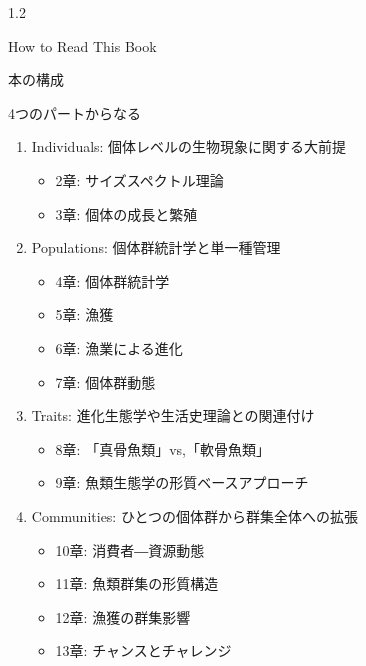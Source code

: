 \documentclass[
  ignorenonframetext,
]{beamer}
\providecommand{\tightlist}{%
  \setlength{\itemsep}{0pt}\setlength{\parskip}{0pt}}
\begin{document}
\begin{frame}

\begin{LARGE} 
\begin{center}
\begin{bf}
1.2   
  
How to Read This Book
\end{bf}
\end{center}
\end{LARGE}

\end{frame}

\begin{frame}{本の構成}
\protect\hypertarget{ux672cux306eux69cbux6210}{}

\begin{block}{4つのパートからなる}

\begin{enumerate}
\tightlist
\item
  Individuals: 個体レベルの生物現象に関する大前提

  \begin{itemize}
  \tightlist
  \item
    2章: サイズスペクトル理論
  \item
    3章: 個体の成長と繁殖
  \end{itemize}
\item
  Populations: 個体群統計学と単一種管理

  \begin{itemize}
  \tightlist
  \item
    4章: 個体群統計学
  \item
    5章: 漁獲
  \item
    6章: 漁業による進化
  \item
    7章: 個体群動態
  \end{itemize}
\item
  Traits: 進化生態学や生活史理論との関連付け

  \begin{itemize}
  \tightlist
  \item
    8章: 「真骨魚類」vs,「軟骨魚類」
  \item
    9章: 魚類生態学の形質ベースアプローチ
  \end{itemize}
\item
  Communities: ひとつの個体群から群集全体への拡張

  \begin{itemize}
  \tightlist
  \item
    10章: 消費者―資源動態
  \item
    11章: 魚類群集の形質構造
  \item
    12章: 漁獲の群集影響
  \item
    13章: チャンスとチャレンジ
  \end{itemize}
\end{enumerate}

\end{block}

\end{frame}
\end{document}
